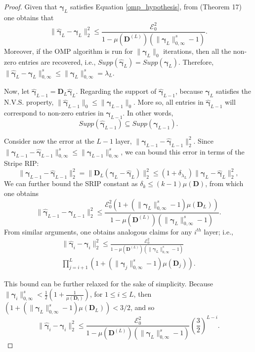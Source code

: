\documentclass[10pt,journal]{IEEEtran}
\def\D{{\mathbf D}}
\def\gama{{\boldsymbol \gamma}}
\theoremstyle{plain}
\theoremstyle{definition}
\begin{document}
\begin{proof}
	Given that $\gama_L$ satisfies Equation \eqref{omp_hypothesis}, from \cite{WorkingLocallyThinkingGlobally} (Theorem 17) one obtains that 
	\begin{equation}
	\|\hat{\gama}_L - \gama_L\|^2_2 \leq \frac{\mathcal{E}_0^2}{1-\mu(\D^{(L)})(\|\gama_L\|^s_{0,\infty}-1)}.
	\end{equation}
	Moreover, if the OMP algorithm is run for $\|\gama_L\|_0$ iterations, then all the non-zero entries are recovered, i.e., $Supp(\hat{\gama}_L) = Supp({\gama}_L)$. Therefore, $\|\hat{\gama}_L - {\gama}_L\|^s_{0,\infty} \leq \| \gama_L\|^s_{0,\infty} = \lambda_L$.
	
	Now, let $\hat{\gama}_{L-1} = \D_{L}\hat{\gama}_L$. Regarding the support of $\hat{\gama}_{L-1}$, because $\gama_L$ satisfies the N.V.S. property, $\|\hat{\gama}_{L-1}\|_0 \leq \|\gama_{L-1}\|_0$. More so, all entries in $\hat{\gama}_{L-1}$ will correspond to non-zero entries in $\gama_{L-1}$. In other words,
	\begin{equation}
	Supp(\hat{\gama}_{L-1}) \subseteq Supp({\gama}_{L-1}).	
	\end{equation}
	
	Consider now the error at the $L-1$ layer, $\|\gama_{L-1}-\hat{\gama}_{L-1}\|_2^2$. Since $\| \gama_{L-1}-\hat{\gama}_{L-1} \|^s_{0,\infty} \leq \|\gama_{L-1}\|^s_{0,\infty}$, we can bound this error in terms of the Stripe RIP:
	\begin{equation}
	\|\gama_{L-1}-\hat{\gama}_{L-1}\|_2^2 = \|\D_L (\gama_{L}-\hat{\gama}_{L})\|_2^2 \leq (1+\delta_{\lambda_L})\|\gama_{L}-\hat{\gama}_{L}\|_2^2,
	\end{equation}
	We can further bound the SRIP constant as $\delta_k \leq (k-1)\mu(\D)$, from which one obtains 
	\begin{equation}
	\|\hat{\gama}_{L-1} - \gama_{L-1}\|^2_2 \leq \frac{\mathcal{E}_0^2 (1+(\|\gama_L\|^s_{0,\infty}-1)\mu(\D_L)) }{1-\mu(\D^{(L)})(\|\gama_L\|^s_{0,\infty}-1)}.
	\end{equation}
	From similar arguments, one obtains analogous claims for any $i^{th}$ layer; i.e., 
	\begin{multline}
	\|\hat{\gama}_{i} - \gama_{i}\|^2_2 \leq \frac{\mathcal{E}_0^2 }{1-\mu(\D^{(L)})(\|\gama_L\|^s_{0,\infty}-1)} \\ \prod_{j=i+1}^{L} (1+(\|\gama_j\|^s_{0,\infty}-1)\mu(\D_j)).
	\end{multline}
	
	This bound can be further relaxed for the sake of simplicity. Because $\|\gama_i\|^s_{0,\infty} < \frac{1}{2}\left(1+\frac{1}{\mu(\D_i)}\right)$, for $1\leq i \leq L$, then $(1+(\|\gama_L\|^s_{0,\infty}-1)\mu(\D_L)) < 3/2$, and so
	\begin{equation}
	\|\hat{\gama}_{i} - \gama_{i}\|^2_2 \leq \frac{\mathcal{E}_0^2 }{1-\mu(\D^{(L)})(\|\gama_L\|^s_{0,\infty}-1)} \left(\frac{3}{2}\right)^{L-i}.
	\end{equation}
\end{proof}
\end{document}
